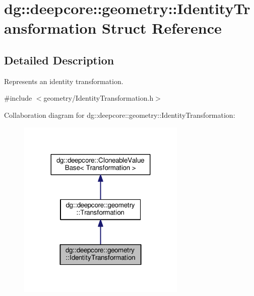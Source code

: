 \hypertarget{structdg_1_1deepcore_1_1geometry_1_1_identity_transformation}{}\section{dg\+:\+:deepcore\+:\+:geometry\+:\+:Identity\+Transformation Struct Reference}
\label{structdg_1_1deepcore_1_1geometry_1_1_identity_transformation}


\subsection{Detailed Description}
Represents an identity transformation. 

{\ttfamily \#include $<$geometry/\+Identity\+Transformation.\+h$>$}



Collaboration diagram for dg\+:\+:deepcore\+:\+:geometry\+:\+:Identity\+Transformation\+:
\nopagebreak
\begin{figure}[H]
\begin{center}
\leavevmode
\includegraphics[width=227pt]{structdg_1_1deepcore_1_1geometry_1_1_identity_transformation__coll__graph}
\end{center}
\end{figure}
